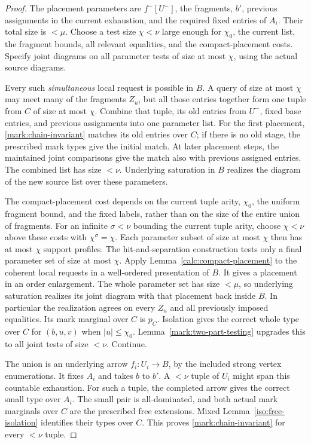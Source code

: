 \begin{proof}
The placement parameters are
\(f^-[U^-]\), the fragments, \(b'\),
previous assignments in the current
exhaustion, and the required fixed
entries of \(A_i\).  Their total
size is \(<\mu\).  Choose a test
size \(\chi<\nu\) large enough
for \(\chi_0\), the current list,
the fragment bounds, all relevant
equalities, and the compact-placement
costs.  Specify joint diagrams on
all parameter tests of size at
most \(\chi\), using the actual
source diagrams.

Every such \emph{simultaneous}
local request is possible in
\(B\).  A query of size at most \(\chi\) may meet many of the
fragments \(Z_u\), but all those entries together form one tuple
from \(C\) of size at most \(\chi\).  Combine that tuple, its old
entries from \(U^-\), fixed base entries, and previous
assignments into one parameter list.  For the first placement,
\eqref{mark:chain-invariant}
matches its old entries over
\(C\); if there is no old stage,
the prescribed mark types give
the initial match.  At later
placement steps, the maintained
joint comparisons give the match
also with previous assigned entries.
The combined list has size \(<\nu\).
Underlying saturation in \(B\)
realizes the diagram of the new
source list over these parameters.

The compact-placement cost depends on the current tuple arity,
\(\chi_0\), the uniform fragment bound, and the fixed labels, rather
than on the size of the entire union of fragments.  For an infinite
\(\sigma<\nu\) bounding the current tuple arity, choose \(\chi<\nu\)
above these costs with \(\chi^\sigma=\chi\).  Each parameter
subset of size at most \(\chi\) then has at most \(\chi\) support
profiles.  The hit-and-separation construction tests only a final
parameter set of size at most \(\chi\).
Apply Lemma~\ref{calc:compact-placement}
to the coherent local requests
in a well-ordered presentation
of \(B\).  It gives a placement
in an order enlargement.  The
whole parameter set has size
\(<\mu\), so underlying saturation
realizes its joint diagram with
that placement back inside \(B\).
In particular the realization
agrees on every \(Z_u\) and all
previously imposed equalities.
Its mark marginal over \(C\)
is \(p_C\).  Isolation gives
the correct whole type over
\(C\) for \((b,u,v)\) when
\(|u|\leq\chi_0\).
Lemma~\ref{mark:two-part-testing}
upgrades this to all joint tests
of size \(<\nu\).  Continue.

The union is an underlying arrow
\(f_i:U_i\to B\), by the included
strong vertex enumerations.
It fixes \(A_i\) and takes \(b\)
to \(b'\).  A \(<\nu\) tuple
of \(U_i\) might span this
countable exhaustion.  For
such a tuple, the completed
arrow gives the correct small
type over \(A_i\).  The small
pair is all-dominated, and
both actual mark marginals
over \(C\) are the prescribed
free extensions.  Mixed
Lemma~\ref{iso:free-isolation}
identifies their types over
\(C\).  This proves
\eqref{mark:chain-invariant}
for every \(<\nu\) tuple.


\end{proof}
